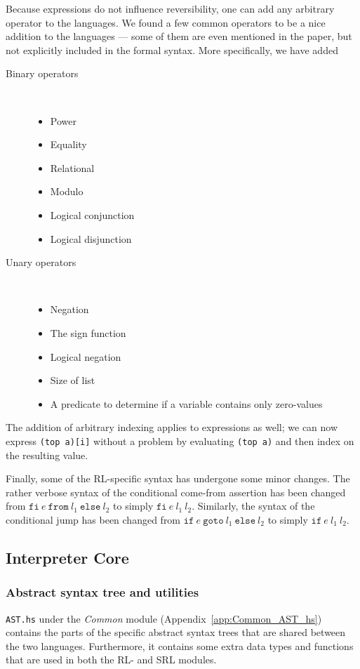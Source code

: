 Because expressions do not influence reversibility, one can add any arbitrary operator to the languages. We found a few common operators to be a nice addition to the languages --- some of them are even mentioned in the paper, but not explicitly included in the formal syntax. More specifically, we have added
\begin{description}
\item[Binary operators]~
  \begin{itemize}
  \item Power
  \item Equality
  \item Relational
  \item Modulo
  \item Logical conjunction
  \item Logical disjunction
\end{itemize}
\item[Unary operators]~
\begin{itemize}
  \item Negation
  \item The sign function
  \item Logical negation
  \item Size of list
  \item A predicate to determine if a variable contains only zero-values
\end{itemize}
\end{description}
The addition of arbitrary indexing applies to expressions as well; we can now express \texttt{(top a)[i]} without a problem by evaluating \texttt{(top a)} and then index on the resulting value.

Finally, some of the RL-specific syntax has undergone some minor changes. The rather verbose syntax of the conditional come-from assertion has been changed from $\texttt{fi} \ e \ \texttt{from} \ l_1 \ \texttt{else} \ l_2$ to simply $\texttt{fi} \ e \ l_1 \ l_2$. Similarly, the syntax of the conditional jump has been changed from $\texttt{if} \ e \ \texttt{goto} \ l_1 \ \texttt{else} \ l_2$ to simply $\texttt{if} \ e \ l_1 \ l_2$.

\subsection{Interpreter Core}

\subsubsection{Abstract syntax tree and utilities}
\texttt{AST.hs} under the \textit{Common} module (Appendix~\ref{app:Common_AST_hs}) contains the parts of the specific abstract syntax trees that are shared between the two languages. Furthermore, it contains some extra data types and functions that are used in both the RL- and SRL modules.

